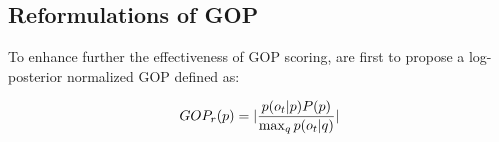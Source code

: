 \documentclass[11pt]{article}
\begin{document}
\subsection{Reformulations of GOP}


To enhance further the effectiveness of GOP scoring, \cite{normalized} are first to propose a log-posterior normalized GOP defined as:

\begin{equation} 
\small
    GOP_r(p) = |\frac{p(o_t|p) P(p)}{\max_q p(o_t|q)}| 
\label{eq:normalized}
\end{equation}
\end{document}

